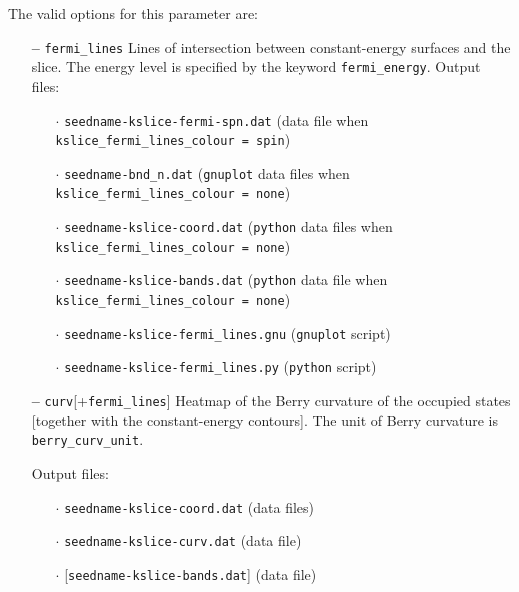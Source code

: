 The valid options for this parameter are:
\begin{itemize}

\item[{\bf --}] \verb#fermi_lines# Lines of intersection between
  constant-energy surfaces and the slice. The energy level is
  specified by the keyword {\tt fermi\_energy}. Output files:

  \begin{itemize}

  \item[$\cdot$] {\tt seedname-kslice-fermi-spn.dat} (data file when
    {\tt kslice\_fermi\_lines\_colour = spin})

  \item[$\cdot$] {\tt seedname-bnd\_n.dat} ({\tt gnuplot} data files
    when {\tt kslice\_fermi\_lines\_colour = none})

  \item[$\cdot$] {\tt seedname-kslice-coord.dat} ({\tt python} data
    files when {\tt kslice\_fermi\_lines\_colour = none})

  \item[$\cdot$] {\tt seedname-kslice-bands.dat} ({\tt python} data
    file when {\tt kslice\_fermi\_lines\_colour = none})

  \item[$\cdot$] {\tt seedname-kslice-fermi\_lines.gnu} ({\tt gnuplot}
    script)

  \item[$\cdot$] {\tt seedname-kslice-fermi\_lines.py} ({\tt python}
    script)

  \end{itemize}

\item[{\bf --}] \verb#curv#[+\verb#fermi_lines#] Heatmap of the Berry
  curvature of the occupied states [together with the constant-energy
  contours]. The unit of Berry curvature is {\tt berry\_curv\_unit}.

Output files:

  \begin{itemize}

  \item[$\cdot$] {\tt seedname-kslice-coord.dat} (data files)
    
  \item[$\cdot$] {\tt seedname-kslice-curv.dat} (data file)

  \item[$\cdot$] [{\tt seedname-kslice-bands.dat}] (data file)
    

\end{itemize}
\end{itemize}
